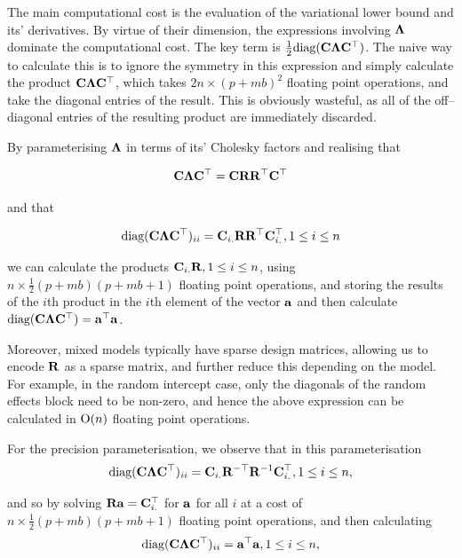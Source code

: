 \documentclass{amsart}[12pt]
\begin{document}
			The main computational cost is the evaluation of the variational lower bound and its' derivatives. By virtue
			of their dimension, the expressions involving ${\boldsymbol \Lambda}$ dominate the computational cost. The key term is
			$\frac{1}{2} \text{diag}({\bf C} {\boldsymbol \Lambda} {\bf C}^\top)$. The naive way to calculate this is to ignore the symmetry in
			this expression and simply calculate the product ${\bf C} {\boldsymbol \Lambda} {\bf C}^\top$, which takes $2 n \times (p + m
			b)^2$ floating point operations, and take the diagonal entries of the result. This is obviously wasteful, as
			all of the off--diagonal entries of the resulting product are immediately discarded.
				
			By parameterising ${\boldsymbol \Lambda}$ in terms of its' Cholesky factors and realising that
				
			\[
				{\bf C} {\boldsymbol \Lambda} {\bf C}^\top = {\bf C} {\bf R} {\bf R}^\top {\bf C}^\top
			\]
				
			\noindent and that
				
			\[
				\text{diag}({\bf C} {\boldsymbol \Lambda} {\bf C}^\top)_{ii} = {\bf C}_{i .} {\bf R} {\bf R}^\top {\bf C}_{i .}^\top, 1 \leq i \leq n
			\]
				
			\noindent we can calculate the products ${\bf C}_{i .} {\bf R}, 1 \leq i \leq n$, using $n \times \frac{1}{2}(p + m
			b)(p + m b   + 1)$ floating point operations, and storing the results of the $i$th product in the $i$th
			element of the   vector ${\bf a}$ and then calculate $\text{diag}({\bf C} {\boldsymbol \Lambda} {\bf C}^\top) = {\bf a}^\top {\bf a}$.
				
			Moreover, mixed models typically have sparse design matrices, allowing us to encode ${\bf R}$ as a sparse matrix, and	further reduce   this depending on the model. For example, in the random intercept case, only the diagonals of the random effects block need to be non-zero, and hence the above expression can be calculated in
			$\text{O}(n)$ floating point operations.
				
				
			For the precision parameterisation, we observe that in this parameterisation
			\[
				\text{diag}({\bf C} {\boldsymbol \Lambda} {\bf C}^\top)_{ii} = {\bf C}_{i .} {\bf R}^{-\top} {\bf R}^{-1} {\bf C}_{i .}^\top, 1 \leq i \leq n,
			\]
				
			\noindent and so by solving ${\bf R} {\bf a} = {\bf C}_{i .}^\top$ for ${\bf a}$ for all $i$ at a cost of $n \times
			\frac{1}{2} (p + m b) (p + m b + 1)$ floating point operations, and then calculating
			\[
				\text{diag}({\bf C} {\boldsymbol \Lambda} {\bf C}^\top)_{ii} = {\bf a}^\top {\bf a}, 1 \leq i \leq n,
			\]
				
\end{document}
